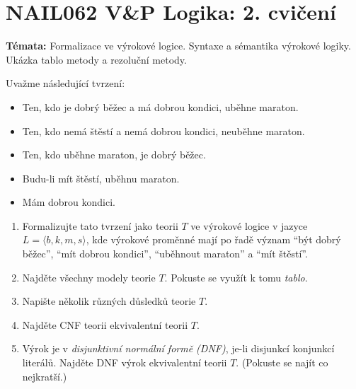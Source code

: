 \documentclass[a4paper,12pt]{article}
\begin{document}
\section*{NAIL062 V\&P Logika: 2. cvičení}


\textbf{Témata:} 
Formalizace ve výrokové logice. Syntaxe a sémantika výrokové logiky. Ukázka tablo metody a rezoluční metody.


\medskip\begin{problem}
Uvažme následující tvrzení:
\begin{itemize}\it
\item Ten, kdo je dobrý běžec a má dobrou kondici, uběhne maraton.
\item Ten, kdo nemá štěstí a nemá dobrou kondici, neuběhne maraton.
\item Ten, kdo uběhne maraton, je dobrý běžec.
\item Budu-li mít štěstí, uběhnu maraton.
\item Mám dobrou kondici.
\end{itemize}
\begin{enumerate}
\item Formalizujte tato tvrzení jako teorii $T$ ve výrokové logice v jazyce $L=\langle b, k, m, s\rangle$, kde výrokové proměnné mají po řadě význam ``být dobrý běžec'', ``mít dobrou kondici'', ``uběhnout maraton'' a ``mít štěstí''.
\item Najděte všechny modely teorie $T$. Pokuste se využít k tomu \emph{tablo}.
\item Napište několik různých důsledků teorie $T$.
\item Najděte CNF teorii ekvivalentní teorii $T$.
\item Výrok je v \emph{disjunktivní normální formě (DNF)}, je-li disjunkcí konjunkcí literálů. Najděte DNF výrok ekvivalentní teorii $T$. (Pokuste se najít co nejkratší.)
\end{enumerate}
\end{problem}
\end{document}
